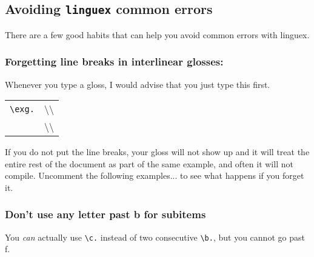 \documentclass[letterpaper]{article}
\begin{document}
\subsection{Avoiding \texttt{linguex} common errors}

There are a few good habits that can help you avoid common errors with linguex.

\subsubsection{Forgetting line breaks in interlinear glosses:}

Whenever you type a gloss, I would advise that you just type this first.

\begin{tabular}{ll} %
    \texttt{\textbackslash exg.} & \textbackslash\textbackslash\\
    & \textbackslash\textbackslash \\ 
    \end{tabular}

    
If you do not put the line breaks, your gloss will not show up and it will treat the entire rest of the document as part of the same example, and often it will not compile.  Uncomment the following examples... to see what happens if you forget it.







\subsubsection{Don't use any letter past b for subitems}

You \textit{can} actually use \texttt{\textbackslash c.} instead of two consecutive \texttt{\textbackslash b.}, but you cannot go past f.
\end{document}
